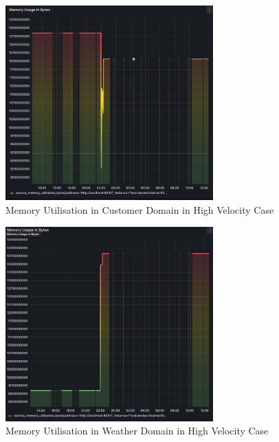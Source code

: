 \documentclass[preprint,12pt]{elsarticle}
\begin{document}
\begin{figure}[ht]

  \centering

  \includegraphics[width=8cm]{images/memory-utilization-in-customer-domain-in-streaming-case.png}

  \caption{Memory Utilisation in Customer Domain in High Velocity Case}

  \label{memoryUtilizationInCustomerDomainInHighVelocityCase}

\end{figure}

\begin{figure}[ht]

  \centering

  \includegraphics[width=8cm]{images/memory-utilization-in-weather-domain-in-streaming-case.png}

  \caption{Memory Utilisation in Weather Domain in High Velocity Case}

  \label{memoryUtilizationInWeatherDomainInHighVelocityCase}

\end{figure}
\end{document}
